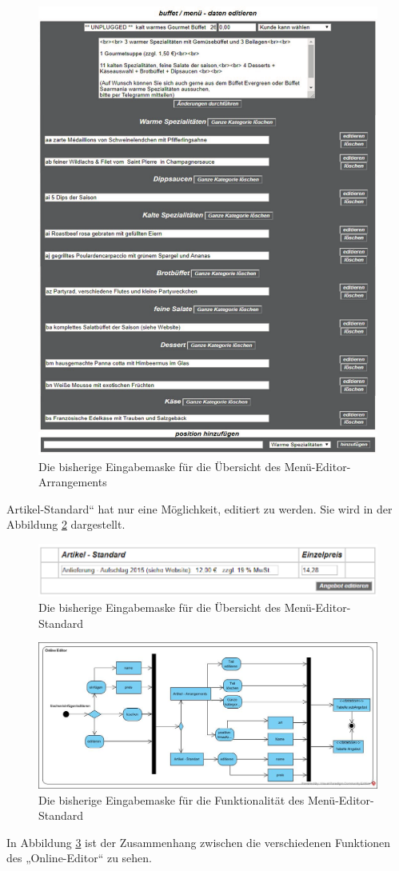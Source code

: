 \pagebreak
\begin{figure}[h]
	\centering
	\includegraphics[width=0.7\linewidth]{Graphics/arrangement-Menue-editor.pdf}
		\caption[Kun2deansicht]{Die bisherige Eingabemaske für die Übersicht des Menü-Editor-Arrangements}
	\label{fig: Editor-Menü2}
\end{figure}


Artikel-Standard“ hat nur eine Möglichkeit, editiert zu werden. Sie wird in der Abbildung \ref{fig: Editor-Menü-Standard}   dargestellt.

\begin{figure}[h]
	\centering
	\includegraphics[width=0.7\linewidth]{Graphics/menuStandart.png}
	\caption[Kundeansicht]{Die bisherige Eingabemaske für die Übersicht des Menü-Editor-Standard}
	\label{fig: Editor-Menü-Standard}
\end{figure}

\begin{figure}[h]
	\centering
	\includegraphics[width=1\linewidth]{Graphics/OnlineEdior.jpg}
	\caption[Kundeansicht]{Die bisherige Eingabemaske für die Funktionalität des Menü-Editor-Standard}
	\label{fig: Editor-Menü-Funktionalität}
\end{figure}
In Abbildung \ref{fig: Editor-Menü-Funktionalität} ist der Zusammenhang zwischen die verschiedenen Funktionen des „Online-Editor“ zu sehen.

